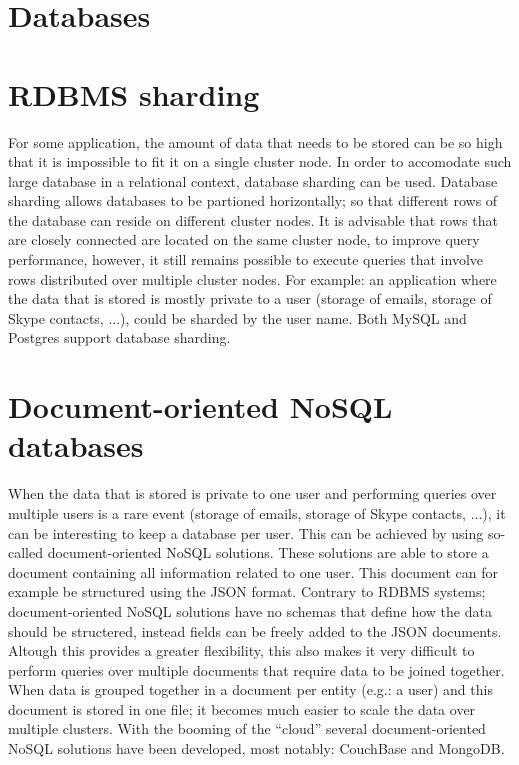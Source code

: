 \documentclass[12pt]{report}
\begin{document}
\section{Databases}
\section{RDBMS sharding}
For some application, the amount of data that needs to be stored can be so high
that it is impossible to fit it on a single cluster node. In order to
accomodate such large database in a relational context, database
sharding can be used. Database sharding allows databases to be
partioned horizontally; so that different rows of the database can
reside on different cluster nodes. It is advisable that rows that are
closely connected are located on the same cluster node, to improve
query performance, however, it still remains possible to execute
queries that involve rows distributed over multiple cluster nodes.
For example: an application where the data that is stored is mostly 
private to a user (storage of emails, storage of Skype contacts, ...),
 could be sharded by the user name.
Both MySQL \cite{mysql_db:2013} and Postgres \cite{postgres_db:2013}
support database sharding.
\section{Document-oriented NoSQL databases}
\label{sec:no_sql}
When the data that is stored is private to one user and performing
queries over multiple users is a rare event (storage of emails,
storage of Skype contacts, ...), it can be interesting to keep a
database per user. This can be achieved by using so-called
document-oriented NoSQL solutions. 
These solutions are able to store a document
containing all information related to one user. This document can for
example be structured using the JSON format. Contrary to RDBMS
systems; document-oriented NoSQL solutions have no schemas that define
how the data should be structered, instead fields can be freely added
to the JSON documents.
Altough this provides a greater flexibility, this also makes it very
difficult to perform queries over multiple documents that require data
to be joined together.
When data is grouped together in a document per entity (e.g.: a user)
and this document is stored in one file; it becomes much easier to scale the data over
multiple clusters.
With the booming of the ``cloud'' several document-oriented NoSQL
solutions have been developed, most notably: CouchBase and MongoDB.
\end{document}
